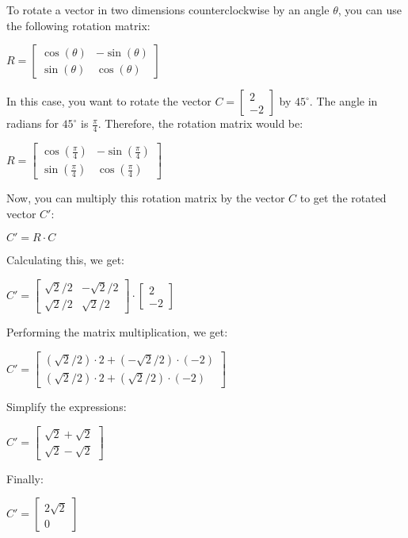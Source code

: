 \documentclass[11pt]{article}
\begin{document}
    To rotate a vector in two dimensions counterclockwise by an angle
$\theta$, you can use the following rotation matrix:

$ R =
\begin{bmatrix} \cos(\theta) & -\sin(\theta) \\ \sin(\theta) & \cos(\theta) \end{bmatrix}
$

In this case, you want to rotate the vector
$C = \begin{bmatrix} 2 \\ -2 \end{bmatrix}$ by $45^\circ$. The angle
in radians for $45^\circ$ is $\frac{\pi}{4}$. Therefore, the
rotation matrix would be:

$ R =
\begin{bmatrix} \cos\left(\frac{\pi}{4}\right) & -\sin\left(\frac{\pi}{4}\right) \\ \sin\left(\frac{\pi}{4}\right) & \cos\left(\frac{\pi}{4}\right) \end{bmatrix}
$

Now, you can multiply this rotation matrix by the vector $C$ to get
the rotated vector $C'$:

$ C' = R \cdot C $

Calculating this, we get:

$ C' =
\begin{bmatrix} \sqrt{2}/2 & -\sqrt{2}/2 \\ \sqrt{2}/2 & \sqrt{2}/2 \end{bmatrix}
\cdot \begin{bmatrix} 2 \\ -2 \end{bmatrix}
$

Performing the matrix multiplication, we get:

$ C' =
\begin{bmatrix} (\sqrt{2}/2) \cdot 2 + (-\sqrt{2}/2) \cdot (-2) \\ (\sqrt{2}/2) \cdot 2 + (\sqrt{2}/2) \cdot (-2) \end{bmatrix}
$

Simplify the expressions:

$ C' =
\begin{bmatrix} \sqrt{2} + \sqrt{2} \\ \sqrt{2} - \sqrt{2} \end{bmatrix}
$

Finally:

$ C' =
\begin{bmatrix} 2\sqrt{2} \\ 0 \end{bmatrix}
$
\end{document}
